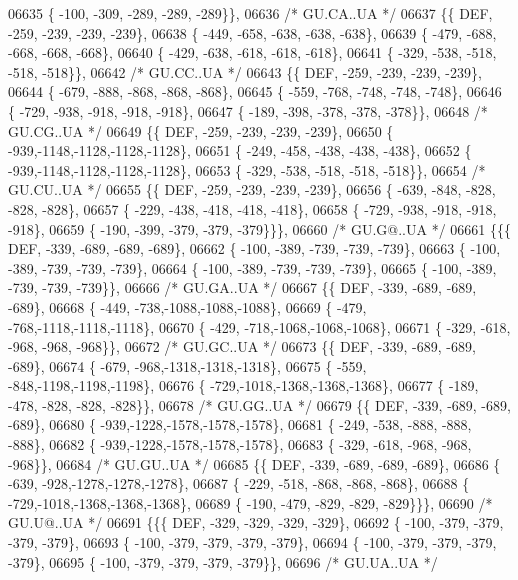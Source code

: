\begin{DoxyCode}
06635 \{ -100, -309, -289, -289, -289\}\},
06636 \textcolor{comment}{/* GU.CA..UA */}
06637 \{\{  DEF, -259, -239, -239, -239\},
06638 \{ -449, -658, -638, -638, -638\},
06639 \{ -479, -688, -668, -668, -668\},
06640 \{ -429, -638, -618, -618, -618\},
06641 \{ -329, -538, -518, -518, -518\}\},
06642 \textcolor{comment}{/* GU.CC..UA */}
06643 \{\{  DEF, -259, -239, -239, -239\},
06644 \{ -679, -888, -868, -868, -868\},
06645 \{ -559, -768, -748, -748, -748\},
06646 \{ -729, -938, -918, -918, -918\},
06647 \{ -189, -398, -378, -378, -378\}\},
06648 \textcolor{comment}{/* GU.CG..UA */}
06649 \{\{  DEF, -259, -239, -239, -239\},
06650 \{ -939,-1148,-1128,-1128,-1128\},
06651 \{ -249, -458, -438, -438, -438\},
06652 \{ -939,-1148,-1128,-1128,-1128\},
06653 \{ -329, -538, -518, -518, -518\}\},
06654 \textcolor{comment}{/* GU.CU..UA */}
06655 \{\{  DEF, -259, -239, -239, -239\},
06656 \{ -639, -848, -828, -828, -828\},
06657 \{ -229, -438, -418, -418, -418\},
06658 \{ -729, -938, -918, -918, -918\},
06659 \{ -190, -399, -379, -379, -379\}\}\},
06660 \textcolor{comment}{/* GU.G@..UA */}
06661 \{\{\{  DEF, -339, -689, -689, -689\},
06662 \{ -100, -389, -739, -739, -739\},
06663 \{ -100, -389, -739, -739, -739\},
06664 \{ -100, -389, -739, -739, -739\},
06665 \{ -100, -389, -739, -739, -739\}\},
06666 \textcolor{comment}{/* GU.GA..UA */}
06667 \{\{  DEF, -339, -689, -689, -689\},
06668 \{ -449, -738,-1088,-1088,-1088\},
06669 \{ -479, -768,-1118,-1118,-1118\},
06670 \{ -429, -718,-1068,-1068,-1068\},
06671 \{ -329, -618, -968, -968, -968\}\},
06672 \textcolor{comment}{/* GU.GC..UA */}
06673 \{\{  DEF, -339, -689, -689, -689\},
06674 \{ -679, -968,-1318,-1318,-1318\},
06675 \{ -559, -848,-1198,-1198,-1198\},
06676 \{ -729,-1018,-1368,-1368,-1368\},
06677 \{ -189, -478, -828, -828, -828\}\},
06678 \textcolor{comment}{/* GU.GG..UA */}
06679 \{\{  DEF, -339, -689, -689, -689\},
06680 \{ -939,-1228,-1578,-1578,-1578\},
06681 \{ -249, -538, -888, -888, -888\},
06682 \{ -939,-1228,-1578,-1578,-1578\},
06683 \{ -329, -618, -968, -968, -968\}\},
06684 \textcolor{comment}{/* GU.GU..UA */}
06685 \{\{  DEF, -339, -689, -689, -689\},
06686 \{ -639, -928,-1278,-1278,-1278\},
06687 \{ -229, -518, -868, -868, -868\},
06688 \{ -729,-1018,-1368,-1368,-1368\},
06689 \{ -190, -479, -829, -829, -829\}\}\},
06690 \textcolor{comment}{/* GU.U@..UA */}
06691 \{\{\{  DEF, -329, -329, -329, -329\},
06692 \{ -100, -379, -379, -379, -379\},
06693 \{ -100, -379, -379, -379, -379\},
06694 \{ -100, -379, -379, -379, -379\},
06695 \{ -100, -379, -379, -379, -379\}\},
06696 \textcolor{comment}{/* GU.UA..UA */}

\end{DoxyCode}

